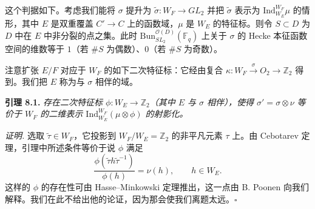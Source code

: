 \documentclass[11pt,a4paper]{article}
\newenvironment{namedlemma}[1]
  {\par\medskip\noindent\textbf{引理 #1.}\itshape\ignorespaces}
  {\par\medskip}
\newcommand{\Bun}{\mathrm{Bun}}
\begin{document}
这个判据如下。考虑我们能将 $\sigma$ 提升为 $\tilde{\sigma} : W_F \to GL_2$ 并把 $\tilde{\sigma}$ 表示为 $\mathrm{Ind}_{W_E}^{W_F}\mu$ 的情形，其中 $E$ 是双重覆盖 $C'\to C$ 上的函数域，$\mu$ 是 $W_E$ 的特征标。则令 $S\subset D$ 为 $D$ 中在 $E$ 中非分裂的点之集。此时 $\Bun^{\mathcal{O}(D)}_{SL_2}(\mathbb{F}_q)$ 上关于 $\sigma$ 的 Hecke 本征函数空间的维数等于 $1$（若 $\#S$ 为偶数）、$0$（若 $\#S$ 为奇数）。

注意扩张 $E/F$ 对应于 $W_F$ 的如下二次特征标：它经由复合 $\kappa : W_F \xrightarrow{\ \sigma\ } O_2 \to \mathbb{Z}_2$ 得到。我们把 $E$ 称为与 $\sigma$ 相伴的域。

\begin{namedlemma}{8.1}
存在二次特征标 $\phi : W_E \to \mathbb{Z}_2$（其中 $E$ 与 $\sigma$ 相伴），使得 $\sigma' = \sigma\otimes\nu$ 等价于 $W_F$ 的二维表示 $\mathrm{Ind}_{W_E}^{W_F}(\mu\otimes\phi)$ 的射影化。
\end{namedlemma}

\textit{证明.} 选取 $\tilde{\tau}\in W_F$，它投影到 $W_F/W_E = \mathbb{Z}_2$ 的非平凡元素 $\tau$ 上。由 Cebotarev 定理，引理中所述条件等价于说 $\phi$ 满足
\[
\frac{\phi(\tilde{\tau}h\tilde{\tau}^{-1})}{\phi(h)} = \nu(h), \qquad h\in W_E.
\]
这样的 $\phi$ 的存在性可由 Hasse--Minkowski 定理推出，这一点由 B. Poonen 向我们解释。我们在此不给出他的论证，因为那会使我们离题太远。\hfill$\square$


\end{document}
